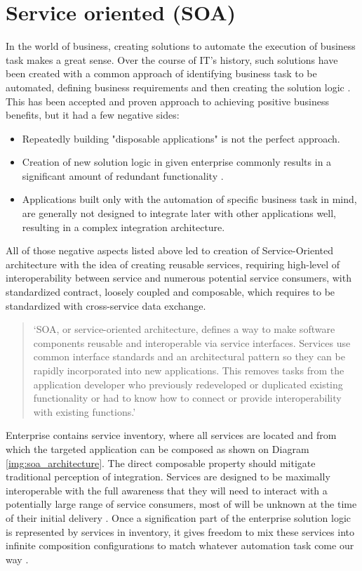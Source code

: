 \section{Service oriented (SOA)}
In the world of business, creating solutions to automate the execution of business task makes a great sense. Over the course of IT's history, such solutions have been created with a common approach of identifying business task to be automated, defining business requirements and then creating the solution logic \cite{SERVICE_ORIENTED_ARCHITECTURE}. This has been accepted and proven approach to achieving positive business benefits, but it had a few negative sides:
\begin{itemize}
    \item  Repeatedly building "disposable applications" is not the perfect approach.
    \item  Creation of new solution logic in given enterprise commonly results in a significant amount of redundant functionality \cite{SERVICE_ORIENTED_ARCHITECTURE}.
    \item Applications built only with the automation of specific business task in mind, are generally not designed to integrate later with other applications well, resulting in a complex integration architecture.
\end{itemize}
All of those negative aspects listed above led to creation of Service-Oriented architecture with the idea of creating reusable services, requiring high-level of interoperability between service and numerous potential service consumers, with standardized contract, loosely coupled and composable, which requires to be standardized with cross-service data exchange.

\begin{quote}
    `SOA, or service-oriented architecture, defines a way to make software components reusable and interoperable via service interfaces. Services use common interface standards and an architectural pattern so they can be rapidly incorporated into new applications. This removes tasks from the application developer who previously redeveloped or duplicated existing functionality or had to know how to connect or provide interoperability with existing functions.' \cite{IBM_SOA}
\end{quote}

Enterprise contains service inventory, where all services are located and from which the targeted application can be composed as shown on Diagram \ref{img:soa_architecture}. The direct composable property should mitigate traditional perception of integration. Services are designed to be maximally interoperable with the full awareness that they will need to interact with a potentially large range of service consumers, most of will be unknown at the time of their initial delivery \cite{SERVICE_ORIENTED_ARCHITECTURE}. Once a signification part of the enterprise solution logic is represented by services in inventory, it gives freedom to mix these services into infinite composition configurations to match whatever automation task come our way \cite{SERVICE_ORIENTED_ARCHITECTURE}.

